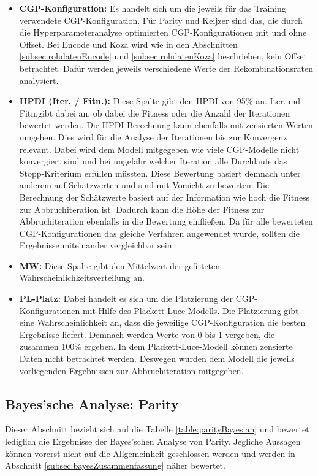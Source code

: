\begin{itemize}
	\item \textbf{CGP-Konfiguration:} Es handelt sich um die jeweils für das Training verwendete CGP-Konfiguration.
	Für Parity und Keijzer sind das, die durch die Hyperparameteranalyse optimierten CGP-Konfigurationen mit und ohne Offset.
	Bei Encode und Koza wird wie in den Abschnitten \ref{subsec:rohdatenEncode} und \ref{subsec:rohdatenKoza} beschrieben, kein Offset betrachtet.
	Dafür werden jeweils verschiedene Werte der Rekombinationsraten analysiert.
	\item \textbf{HPDI (Iter. / Fitn.):} Diese Spalte gibt den HPDI von 95\% an.
	\glqq Iter.\grqq\space und \glqq Fitn.\grqq\space gibt dabei an, ob dabei die Fitness oder die Anzahl der Iterationen bewertet werden.
	Die HPDI-Berechnung kann ebenfalls mit zensierten Werten umgehen.
	Dies wird für die Analyse der Iterationen bis zur Konvergenz relevant.
	Dabei wird dem Modell mitgegeben wie viele CGP-Modelle nicht konvergiert sind und bei ungefähr welcher Iteration alle Durchläufe das Stopp-Kriterium erfüllen müssten.
	Diese Bewertung basiert demnach unter anderem auf Schätzwerten und sind mit Vorsicht zu bewerten.
	Die Berechnung der Schätzwerte basiert auf der Information wie hoch die Fitness zur Abbruchiteration ist.
	Dadurch kann die Höhe der Fitness zur Abbruchiteration ebenfalls in die Bewertung einfließen.
	Da für alle bewerteten CGP-Konfigurationen das gleiche Verfahren angewendet wurde, sollten die Ergebnisse miteinander vergleichbar sein.
	\item \textbf{MW:} Diese Spalte gibt den Mittelwert der gefitteten Wahrscheinlichkeitsverteilung an.
	\item \textbf{PL-Platz:} Dabei handelt es sich um die Platzierung der CGP-Konfigurationen mit Hilfe des Plackett-Luce-Modells.
	Die Platzierung gibt eine Wahrscheinlichkeit an, dass die jeweilige CGP-Konfiguration die besten Ergebnisse liefert.
	Demnach werden Werte von 0 bis 1 vergeben, die zusammen 100\% ergeben.
	In dem Plackett-Luce-Modell können zensierte Daten nicht betrachtet werden.
	Deswegen wurden dem Modell die jeweils vorliegenden Ergebnissen zur Abbruchiteration mitgegeben.
\end{itemize}

\subsection{Bayes'sche Analyse: Parity}
\label{subsec:bayesParity}

Dieser Abschnitt bezieht sich auf die Tabelle \ref{table:parityBayesian} und bewertet lediglich die Ergebnisse der Bayes'schen Analyse von Parity.
Jegliche Aussagen können vorerst nicht auf die Allgemeinheit geschlossen werden und werden in Abschnitt \ref{subsec:bayesZusammenfassung} näher bewertet.
